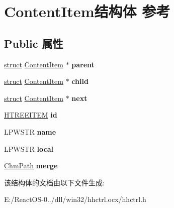 \hypertarget{struct_content_item}{}\section{Content\+Item结构体 参考}
\label{struct_content_item}
\subsection*{Public 属性}
\begin{DoxyCompactItemize}
\item 
\mbox{\label{struct_content_item_a02dce7741708a230486be236e0710963}} 
\hyperlink{interfacestruct}{struct} \hyperlink{struct_content_item}{Content\+Item} $\ast$ {\bfseries parent}
\item 
\mbox{\label{struct_content_item_a27571506f307bf4dfe7c0e62d675e273}} 
\hyperlink{interfacestruct}{struct} \hyperlink{struct_content_item}{Content\+Item} $\ast$ {\bfseries child}
\item 
\mbox{\label{struct_content_item_a19a4aa93c3813bd2bf02d4a9e60e7c40}} 
\hyperlink{interfacestruct}{struct} \hyperlink{struct_content_item}{Content\+Item} $\ast$ {\bfseries next}
\item 
\mbox{\label{struct_content_item_abde685204e3cbab95873db8b60952349}} 
\hyperlink{struct___t_r_e_e_i_t_e_m}{H\+T\+R\+E\+E\+I\+T\+EM} {\bfseries id}
\item 
\mbox{\label{struct_content_item_aeea36d0fd94117c7151c6580b0b5adbf}} 
L\+P\+W\+S\+TR {\bfseries name}
\item 
\mbox{\label{struct_content_item_a2ca4bae3b283a9a2623a15cc825ff586}} 
L\+P\+W\+S\+TR {\bfseries local}
\item 
\mbox{\label{struct_content_item_a440523b4fb9bf363a7caa3e19f9dd94e}} 
\hyperlink{struct_chm_path}{Chm\+Path} {\bfseries merge}
\end{DoxyCompactItemize}


该结构体的文档由以下文件生成\+:\begin{DoxyCompactItemize}
\item 
E\+:/\+React\+O\+S-\/0../dll/win32/hhctrl.\+ocx/hhctrl.\+h\end{DoxyCompactItemize}
